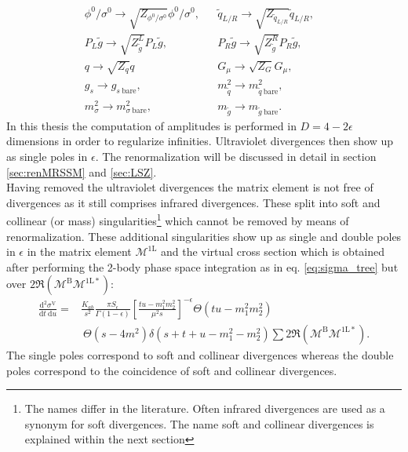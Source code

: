 \begin{align}
& \phi^0 / \sigma^0 \to \sqrt{Z_{\phi^0 / \sigma^0}}\phi^0 / \sigma^0, && \tilde{q}_{L/R} \to \sqrt{Z_{\tilde{q}_{L/R}}}\tilde{q}_{L/R}, \nonumber\\
& P_L \tilde{g} \to \sqrt{Z_{\tilde{g}}^L} P_L \tilde{g}, && P_R \tilde{g} \to \sqrt{Z_{\tilde{g}}^R} P_R \tilde{g},\nonumber\\
& q \to \sqrt{Z_q}q && G_\mu \to \sqrt{Z_G} G_\mu, && \label{eq:fieldtrafo}\\
& g_s \to g_{s\ \mathrm{bare}}, && m_{\tilde{q}}^2 \to m_{\tilde{q}\ \mathrm{bare}}^2, \nonumber\\
&  m_{\sigma}^2 \to m_{\sigma\ \mathrm{bare}}^2, && m_{\tilde{g}} \to m_{\tilde{g}\ \mathrm{bare}}.\label{eq:parametertrafo}
\end{align}
In this thesis the computation of amplitudes is performed in $D = 4-2\epsilon$ dimensions in order to regularize infinities. Ultraviolet divergences then show up as single poles in $\epsilon$. The renormalization will be discussed in detail in section \ref{sec:renMRSSM} and \ref{sec:LSZ}.\\
Having removed the ultraviolet divergences the matrix element is not free of divergences as it still comprises infrared divergences. These split into soft and collinear (or mass) singularities\footnote{The names differ in the literature. Often infrared divergences are used as a synonym for soft divergences. The name soft and collinear divergences is explained within the next section} which cannot be removed by means of renormalization. These additional singularities show up as single and double poles in $\epsilon$ in the matrix element $\mathcal{M^{\mathrm{1L}}}$ and the virtual cross section which is obtained after performing the 2-body phase space integration as in eq. \eqref{eq:sigma_tree} but over $2 \Re \left( \mathcal{M}^{\mathrm{B}} \mathcal{M}^{\mathrm{1L}\ast} \right)$:
\begin{align}
\frac{\mbox{d}^2 \sigma^{\mathrm{V}}}{\mbox{d}t\ \mbox{d}u} =& \frac{K_{ab}}{s^2} \frac{\pi S_{\epsilon}}{\Gamma(1-\epsilon)} \left[ \frac{tu-m_1^2m_2^2}{\mu^2 s}\right]^{-\epsilon} \Theta(tu-m_1^2m_2^2)\nonumber\\
&\ \Theta(s-4m^2) \delta(s+t+u-m_1^2-m_2^2) \sum 2 \Re \left( \mathcal{M}^{\mathrm{B}} \mathcal{M}^{\mathrm{1L}\ast} \right).\label{eq:diffsigma}
\end{align}
The single poles correspond to soft and collinear divergences whereas the double poles correspond to the coincidence of soft and collinear divergences.


